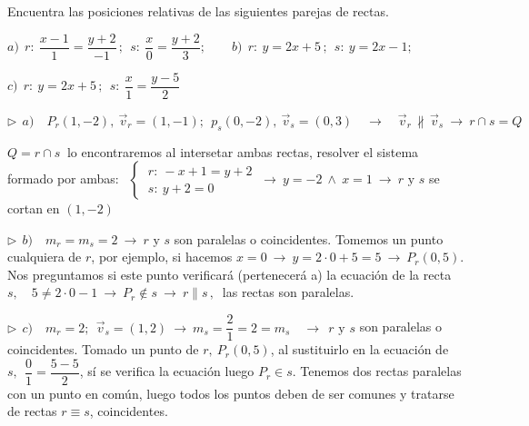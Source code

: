 \vspace{5mm}
\begin{miejemplo}

Encuentra las posiciones relativas de las siguientes parejas de rectas.

\vspace{2mm} $a)\ \ r:\ \dfrac{x-1}{1}=\dfrac{y+2}{-1} \, ; \ \ s:\ \dfrac{x}{0}=\dfrac{y+2}{3};\qquad b) \ \  r:\ y=2x+5\, ;\ \ s:\ y=2x-1;\qquad $

\vspace{2mm} $c)\ \ r:\ y=2x+5\, ;\ \ s:\ \dfrac x 1 =\dfrac{y-5}{2}$	

\vspace{8mm} $\triangleright \ \ a)\quad P_r(1,-2),\ \vec v_r=(1,-1);\ \ p_s(0,-2),\ \vec v_s=(0,3) \quad \to \quad \vec v_r \, \not \parallel \, \vec v_s \ \to \ r\cap s=Q$

\vspace{2mm} $Q=r\cap s\ $ lo encontraremos al intersetar ambas rectas, resolver el sistema formado por ambas: $\ \ \begin{cases} \ r:\ -x+1=y+2 \\ \ s:\ y+2=0 \end{cases} \ \to \ y=-2 \ \wedge \ x= 1 \ \to \ r \text{ y } s $ se cortan en $(1,-2)$ 

\vspace{5mm} $\triangleright \ \ b)\quad m_r=m_s=2 \ \to \ r \text{ y } s $ son paralelas o coincidentes.  Tomemos un punto cualquiera de $r$, por ejemplo, si hacemos $x=0 \ \to \ y=2\cdot 0+5=5 \ \to \ P_r(0,5)$. Nos preguntamos si este punto verificará (pertenecerá a) la ecuación de la recta $s,\quad 5  \neq  2\cdot 0-1 \ \to \ P_r \notin s \ \to \ r\parallel s\, , \ $ las rectas son paralelas. 

\vspace{5mm} $\triangleright \ \ c)\quad m_r=2;\ \ \vec v_s=(1,2) \ \to \ m_s=\dfrac 2 1 =2=m_s \quad \to \ \ r \text{ y } s $ son paralelas o coincidentes. Tomado un punto de $r,\ P_r(0,5)$, al sustituirlo en la ecuación de $s,\ \ \dfrac{0}{1}=\dfrac{5-5}{2}$, sí se verifica la ecuación luego $P_r\in s$. Tenemos dos rectas paralelas con un punto en común, luego todos los puntos deben de ser comunes y tratarse de rectas $r\equiv s$, coincidentes. 
\end{miejemplo}


